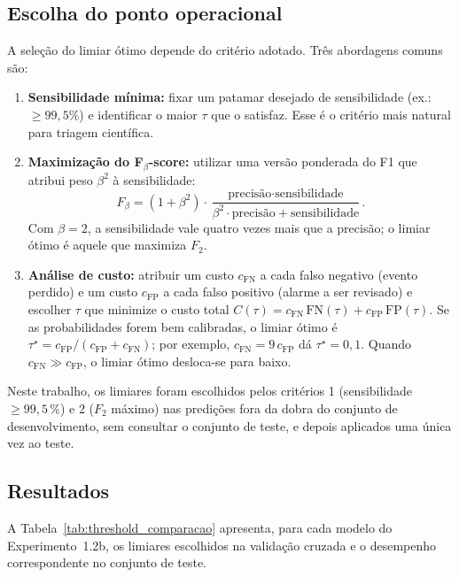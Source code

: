 \subsection{Escolha do ponto operacional}

A seleção do limiar ótimo depende do critério adotado. Três abordagens comuns são:

\begin{enumerate}
	\item \textbf{Sensibilidade mínima:} fixar um patamar desejado de sensibilidade (ex.: $\geq 99{,}5\%$) e identificar o maior $\tau$ que o satisfaz. Esse é o critério mais natural para triagem científica.
	\item \textbf{Maximização do F$_\beta$-score:} utilizar uma versão ponderada do F1 que atribui peso $\beta^2$ à sensibilidade:
	\[
	F_\beta = (1 + \beta^2) \cdot \frac{\text{precisão} \cdot \text{sensibilidade}}{\beta^2 \cdot \text{precisão} + \text{sensibilidade}}.
	\]
	Com $\beta = 2$, a sensibilidade vale quatro vezes mais que a precisão; o limiar ótimo é aquele que maximiza $F_2$.
	\item \textbf{Análise de custo:} atribuir um custo $c_{\text{FN}}$ a cada falso negativo (evento perdido) e um custo $c_{\text{FP}}$ a cada falso positivo (alarme a ser revisado) e escolher $\tau$ que minimize o custo total $C(\tau) = c_{\text{FN}}\,\mathrm{FN}(\tau) + c_{\text{FP}}\,\mathrm{FP}(\tau)$. Se as probabilidades forem bem calibradas, o limiar ótimo é $\tau^\star = c_{\text{FP}}/(c_{\text{FP}} + c_{\text{FN}})$; por exemplo, $c_{\text{FN}} = 9\,c_{\text{FP}}$ dá $\tau^\star = 0{,}1$. Quando $c_{\text{FN}} \gg c_{\text{FP}}$, o limiar ótimo desloca-se para baixo.
\end{enumerate}

Neste trabalho, os limiares foram escolhidos pelos critérios 1 (sensibilidade $\geq 99{,}5\,\%$) e 2 ($F_2$ máximo) nas predições fora da dobra do conjunto de desenvolvimento, sem consultar o conjunto de teste, e depois aplicados uma única vez ao teste.

\subsection{Resultados}
\label{sec:threshold_resultados}

A Tabela~\ref{tab:threshold_comparacao} apresenta, para cada modelo do Experimento~1.2b, os limiares escolhidos na validação cruzada e o desempenho correspondente no conjunto de teste.

